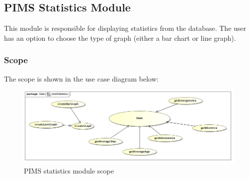 \subsection{PIMS Statistics Module}
This module is responsible for displaying statistics from the database. The user has an option to choose the type of graph (either a bar chart or line graph). \par 

\subsubsection{Scope}
The scope is shown in the use case diagram below: \par
\begin{figure}[H]
	\centerline{\includegraphics[width=0.7\linewidth]{./Graphics/pimsStats/pimsStatistics}}
	\caption{PIMS statistics module scope}
\end{figure}

